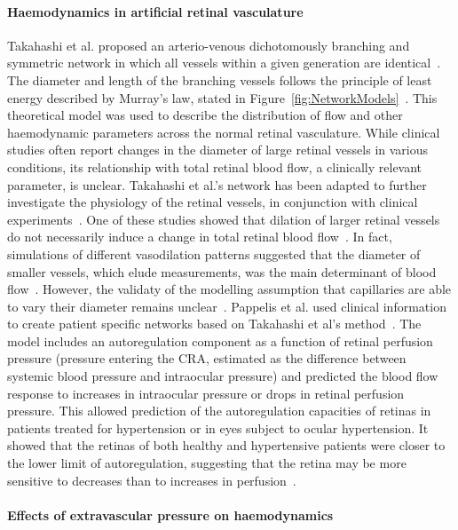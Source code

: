 \documentclass{article}
\begin{document}
\paragraph*{Haemodynamics in artificial retinal vasculature}

Takahashi et al. proposed an arterio-venous dichotomously branching and symmetric network in which all vessels within a given generation are identical~\cite{Takahashi_2009}.
The diameter and length of the branching vessels follows the principle of least energy described by Murray's law, stated in Figure~\ref{fig:NetworkModels}~\cite{Murray_1926}.
This theoretical model was used to describe the distribution of flow and other haemodynamic parameters across the normal retinal vasculature.
While clinical studies often report changes in the diameter of large retinal vessels in various conditions, its relationship with total retinal blood flow, a clinically relevant parameter, is unclear.
Takahashi et al.'s network has been adapted to further investigate the physiology of the retinal vessels, in conjunction with clinical experiments~\cite{Aschinger_2017,Pappelis_2020}.
One of these studies showed that dilation of larger retinal vessels do not necessarily induce a change in total retinal blood flow~\cite{Aschinger_2017}.
In fact, simulations of different vasodilation patterns suggested that the diameter of smaller vessels, which elude measurements, was the main determinant of blood flow~\cite{Aschinger_2017}.
However, the validaty of the modelling assumption that capillaries are able to vary their diameter remains unclear~\cite{Kur_2012}.
Pappelis et al. used clinical information to create patient specific networks based on Takahashi et al's method~\cite{Pappelis_2020}.
The model includes an autoregulation component as a function of retinal perfusion pressure (pressure entering the CRA, estimated as the difference between systemic blood pressure and intraocular pressure) and predicted the blood flow response to increases in intraocular pressure or drops in retinal perfusion pressure.
This allowed prediction of the autoregulation capacities of retinas in patients treated for hypertension or in eyes subject to ocular hypertension.
It showed that the retinas of both healthy and hypertensive patients were closer to the lower limit of autoregulation, suggesting that the retina may be more sensitive to decreases than to increases in perfusion~\cite{Pappelis_2020}.


\paragraph*{Effects of extravascular pressure on haemodynamics} %
\end{document}

